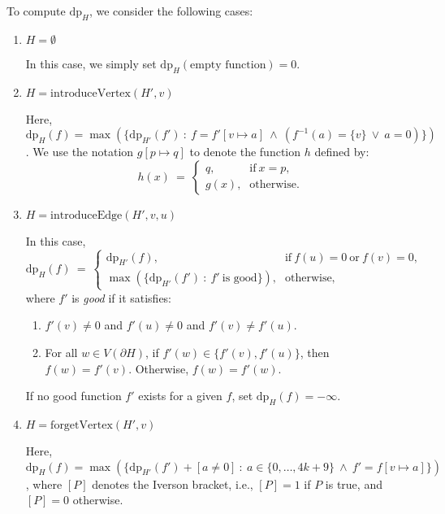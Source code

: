 \documentclass[12pt]{article}
\begin{document}
	To compute \(\text{dp}_{H}\), we consider the following cases:
	\begin{enumerate}
		\item \(H = \emptyset\)
		      
		      In this case, we simply set \(\text{dp}_{H}(\text{empty function})
		      = 0\).
		
		\item \(H = \text{introduceVertex}(H', v)\)
		      
		      Here, \(\text{dp}_{H}(f) = \max(\{\text{dp}_{H'}(f') \ : \ f =
		      f'[v \mapsto a] \ \wedge \ (f^{-1}(a) = \{v\} \ \vee \ a =
		      0)\})\). We use the notation \(g[p \mapsto q]\) to denote the
		      function \(h\) defined by:
		      \[ h(x) \ = \ \begin{cases} q \text{,} & \text{if} \ x = p
		      \text{,} \\
		      g(x) \text{,} & \text{otherwise.} \end{cases} \]
		
		\item \(H = \text{introduceEdge}(H', v, u)\)
		      
		      In this case,
		      \[ \text{dp}_{H}(f) \ = \ \begin{cases} \text{dp}_{H'}(f) \text{,}
		      & \text{if} \ f(u) = 0 \ \text{or} \ f(v) = 0 \text{,} \\
		      \max(\{\text{dp}_{H'}(f') \ : \ f' \ \text{is good}\}) \text{,} &
		      \text{otherwise,} \end{cases} \]
		      where \(f'\) is \textit{good} if it satisfies:
		      \begin{enumerate}[label=\theenumi.\arabic*]
		          \item \(f'(v) \neq 0\) and \(f'(u) \neq 0\) and \(f'(v) \neq
		                f'(u)\).
		          \item For all \(w \in V(\partial H)\), if \(f'(w) \in \{f'(v),
		                f'(u)\}\), then \(f(w) = f'(v)\). Otherwise, \(f(w) =
		                f'(w)\).
		      \end{enumerate}
		      
		      If no good function \(f'\) exists for a given \(f\), set
		      \(\text{dp}_{H}(f) = -\infty\).
		
		\item \(H = \text{forgetVertex}(H', v)\)
		      
		      Here, \(\text{dp}_{H}(f) = \max(\{\text{dp}_{H'}(f') + [a \neq 0]
		      \ : \ a \in \{0, \ldots, 4k + 9\} \ \wedge \ f' = f[v \mapsto
		      a]\})\), where \([P]\) denotes the Iverson bracket, i.e., \([P] =
		      1\) if \(P\) is true, and \([P] = 0\) otherwise.
		      

\end{enumerate}
\end{document}
